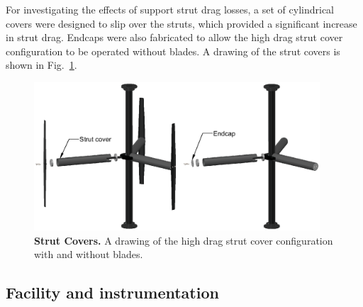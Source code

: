 \documentclass[10pt,letterpaper]{article}
\begin{document}
For investigating the effects of support strut drag losses, a set of cylindrical
covers were designed to slip over the struts, which provided a significant
increase in strut drag. Endcaps were also fabricated to allow the high drag
strut cover configuration to be operated without blades. A drawing of the strut
covers is shown in Fig.~\ref{fig:covers}.

\begin{figure}
    \includegraphics[width=0.95\textwidth]{figures/strut_covers.eps}
    
    \caption{{\bf Strut Covers.} A drawing of the high drag strut cover
        configuration with and without blades.}
    
    \label{fig:covers}
\end{figure}


\subsection*{Facility and instrumentation}
\end{document}
